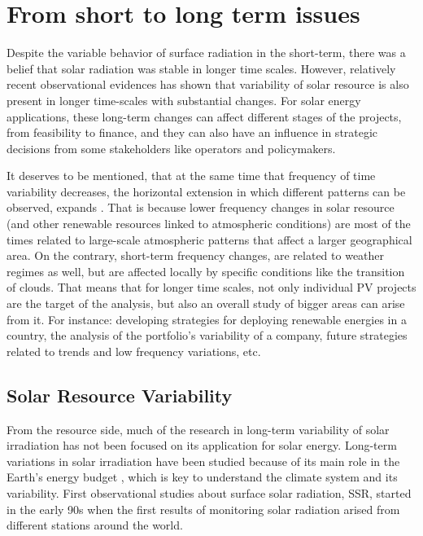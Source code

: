 \section{From short to long term issues}%

Despite the variable behavior of surface radiation in the short-term, there was a belief that solar radiation was stable in longer time scales. However, relatively recent observational evidences has shown that variability of solar resource is also present in longer time-scales with substantial changes. For solar energy applications, these long-term changes can affect different stages of the projects, from feasibility to finance, and they can also have an influence in strategic decisions from some stakeholders like operators and policymakers.

It deserves to be mentioned, that at the same time that frequency of time variability decreases, the horizontal extension in which different patterns can be observed, expands \cite*{Engeland2017}. That is because lower frequency changes in solar resource (and other renewable resources linked to atmospheric conditions) are most of the times related to large-scale atmospheric patterns that affect a larger geographical area. On the contrary, short-term frequency changes, are related to weather regimes as well, but are affected locally by specific conditions like the transition of clouds. That means that for longer time scales, not only individual PV projects are the target of the analysis, but also an overall study of bigger areas can arise from it. For instance: developing strategies for deploying renewable energies in a country, the analysis of the portfolio's variability of a company, future strategies related to trends and low frequency variations, etc. 
  
\subsection{Solar Resource Variability}

From the resource side, much of the research in long-term variability of solar irradiation has not been focused on its application for solar energy. Long-term variations in solar irradiation have been studied because of its main role in the Earth's energy budget \cite*{Wild2012}, which is key to understand the climate system and its variability. First observational studies about surface solar radiation, SSR, started in the early 90s \cite*{Ohmura, Dutton2006} when the first results of monitoring solar radiation arised from different stations around the world.

